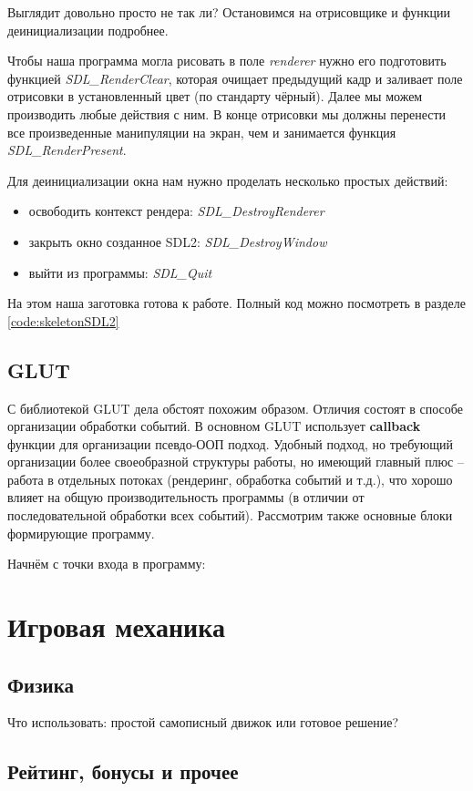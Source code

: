 Выглядит довольно просто не так ли? Остановимся на отрисовщике и функции деинициализации подробнее.

Чтобы наша программа могла рисовать в поле \emph{renderer} нужно его подготовить функцией 
\emph{SDL\_RenderClear}, которая очищает предыдущий кадр и заливает поле отрисовки в установленный 
цвет (по стандарту чёрный). Далее мы можем производить любые действия с ним. В конце отрисовки мы 
должны перенести все произведенные манипуляции на экран, чем и занимается функция 
\emph{SDL\_RenderPresent}.

Для деинициализации окна нам нужно проделать несколько простых действий:
\begin{itemize}
    \item освободить контекст рендера: \emph{SDL\_DestroyRenderer}
    \item закрыть окно созданное SDL2: \emph{SDL\_DestroyWindow}
    \item выйти из программы: \emph{SDL\_Quit}
\end{itemize}

На этом наша заготовка готова к работе. Полный код можно посмотреть в разделе \ref{code:skeletonSDL2}

\subsection{GLUT}
С библиотекой GLUT дела обстоят похожим образом. Отличия состоят в способе организации обработки событий.
В основном GLUT использует \textbf{callback} функции для организации псевдо-ООП подход. Удобный подход, но 
требующий организации более своеобразной структуры работы, но имеющий главный плюс -- работа в отдельных 
потоках (рендеринг, обработка событий и т.д.), что хорошо влияет на общую производительность программы 
(в отличии от последовательной обработки всех событий). Рассмотрим также основные блоки формирующие 
программу.

Начнём с точки входа в программу:


\section{Игровая механика}
\subsection{Физика}
Что использовать: простой самописный движок или готовое решение?
\subsection{Рейтинг, бонусы и прочее}
